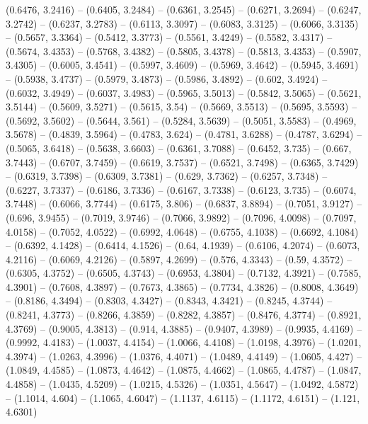 {  (0.6476, 3.2416) -- (0.6405, 3.2484) -- (0.6361, 3.2545) -- (0.6271, 3.2694) 
  -- (0.6247, 3.2742) -- (0.6237, 3.2783) -- (0.6113, 3.3097) -- (0.6083, 
  3.3125) -- (0.6066, 3.3135) -- (0.5657, 3.3364) -- (0.5412, 3.3773) -- 
  (0.5561, 3.4249) -- (0.5582, 3.4317) -- (0.5674, 3.4353) -- (0.5768, 3.4382) 
  -- (0.5805, 3.4378) -- (0.5813, 3.4353) -- (0.5907, 3.4305) -- (0.6005, 
  3.4541) -- (0.5997, 3.4609) -- (0.5969, 3.4642) -- (0.5945, 3.4691) -- 
  (0.5938, 3.4737) -- (0.5979, 3.4873) -- (0.5986, 3.4892) -- (0.602, 3.4924) --
   (0.6032, 3.4949) -- (0.6037, 3.4983) -- (0.5965, 3.5013) -- (0.5842, 3.5065) 
  -- (0.5621, 3.5144) -- (0.5609, 3.5271) -- (0.5615, 3.54) -- (0.5669, 3.5513) 
  -- (0.5695, 3.5593) -- (0.5692, 3.5602) -- (0.5644, 3.561) -- (0.5284, 3.5639)
   -- (0.5051, 3.5583) -- (0.4969, 3.5678) -- (0.4839, 3.5964) -- (0.4783, 
  3.624) -- (0.4781, 3.6288) -- (0.4787, 3.6294) -- (0.5065, 3.6418) -- (0.5638,
   3.6603) -- (0.6361, 3.7088) -- (0.6452, 3.735) -- (0.667, 3.7443) -- (0.6707,
   3.7459) -- (0.6619, 3.7537) -- (0.6521, 3.7498) -- (0.6365, 3.7429) -- 
  (0.6319, 3.7398) -- (0.6309, 3.7381) -- (0.629, 3.7362) -- (0.6257, 3.7348) --
   (0.6227, 3.7337) -- (0.6186, 3.7336) -- (0.6167, 3.7338) -- (0.6123, 3.735) 
  -- (0.6074, 3.7448) -- (0.6066, 3.7744) -- (0.6175, 3.806) -- (0.6837, 3.8894)
   -- (0.7051, 3.9127) -- (0.696, 3.9455) -- (0.7019, 3.9746) -- (0.7066, 
  3.9892) -- (0.7096, 4.0098) -- (0.7097, 4.0158) -- (0.7052, 4.0522) -- 
  (0.6992, 4.0648) -- (0.6755, 4.1038) -- (0.6692, 4.1084) -- (0.6392, 4.1428) 
  -- (0.6414, 4.1526) -- (0.64, 4.1939) -- (0.6106, 4.2074) -- (0.6073, 4.2116) 
  -- (0.6069, 4.2126) -- (0.5897, 4.2699) -- (0.576, 4.3343) -- (0.59, 4.3572) 
  -- (0.6305, 4.3752) -- (0.6505, 4.3743) -- (0.6953, 4.3804) -- (0.7132, 
  4.3921) -- (0.7585, 4.3901) -- (0.7608, 4.3897) -- (0.7673, 4.3865) -- 
  (0.7734, 4.3826) -- (0.8008, 4.3649) -- (0.8186, 4.3494) -- (0.8303, 4.3427) 
  -- (0.8343, 4.3421) -- (0.8245, 4.3744) -- (0.8241, 4.3773) -- (0.8266, 
  4.3859) -- (0.8282, 4.3857) -- (0.8476, 4.3774) -- (0.8921, 4.3769) -- 
  (0.9005, 4.3813) -- (0.914, 4.3885) -- (0.9407, 4.3989) -- (0.9935, 4.4169) --
   (0.9992, 4.4183) -- (1.0037, 4.4154) -- (1.0066, 4.4108) -- (1.0198, 4.3976) 
  -- (1.0201, 4.3974) -- (1.0263, 4.3996) -- (1.0376, 4.4071) -- (1.0489, 
  4.4149) -- (1.0605, 4.427) -- (1.0849, 4.4585) -- (1.0873, 4.4642) -- (1.0875,
   4.4662) -- (1.0865, 4.4787) -- (1.0847, 4.4858) -- (1.0435, 4.5209) -- 
  (1.0215, 4.5326) -- (1.0351, 4.5647) -- (1.0492, 4.5872) -- (1.1014, 4.604) --
   (1.1065, 4.6047) -- (1.1137, 4.6115) -- (1.1172, 4.6151) -- (1.121, 4.6301) 
}
